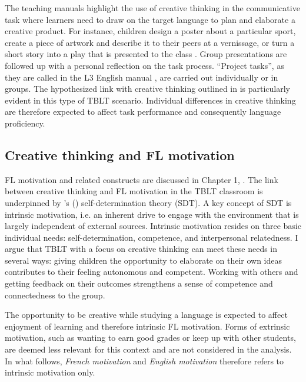 \documentclass[output=paper]{langsci/langscibook}
\begin{document}
The teaching manuals highlight the use of creative thinking in the communicative task where learners need to draw on the target language to plan and elaborate a creative product. For instance, children design a poster about a particular sport, create a piece of artwork and describe it to their peers at a vernissage, or turn a short story into a play that is presented to the class \citep{ArnetClarkEtAl2013}. Group presentations are followed up with a personal reflection on the task process. ``Project tasks'', as they are called in the L3 English manual \citep{ArnetClarkEtAl2013}, are carried out individually or in groups. The hypothesized link with creative thinking outlined in  is particularly evident in this type of TBLT scenario. Individual differences in creative thinking are therefore expected to affect task performance and consequently language proficiency. 

\subsection{Creative thinking and FL motivation}

FL motivation and related constructs are discussed in Chapter 1, . The link between creative thinking and FL motivation in the TBLT classroom is underpinned by \citeauthor{DeciRyan1985}'s (\citeyear{DeciRyan1985,DeciRyan2002}) self-determination theory (SDT). A key concept of SDT is intrinsic motivation, i.e. an inherent drive to engage with the environment that is largely independent of external sources. Intrinsic motivation resides on three basic individual needs: self-determination, competence, and interpersonal relatedness. I argue that TBLT with a focus on creative thinking can meet these needs in several ways: giving children the opportunity to elaborate on their own ideas contributes to their feeling autonomous and competent. Working with others and getting feedback on their outcomes strengthens a sense of competence and connectedness to the group.

The opportunity to be creative while studying a language is expected to affect enjoyment of learning and therefore intrinsic FL motivation. Forms of extrinsic motivation, such as wanting to earn good grades or keep up with other students, are deemed less relevant for this context and are not considered in the analysis. In what follows, \textit{French motivation} and \textit{English motivation} therefore refers to intrinsic motivation only. 
\end{document}
